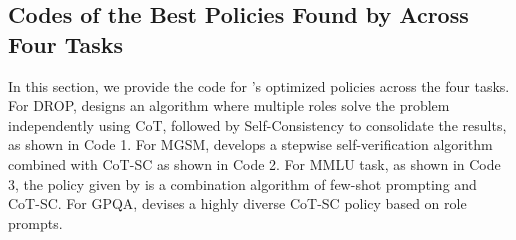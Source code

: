 \subsection{Codes of the Best Policies Found by \framework Across Four Tasks}
\label{sec:maincode}
In this section, we provide the code for \framework's optimized policies across the four tasks. 
For DROP, \framework designs an algorithm where multiple roles solve the problem independently using CoT, followed by Self-Consistency to consolidate the results, as shown in Code 1.
For MGSM, \framework develops a stepwise self-verification algorithm combined with CoT-SC as shown in Code 2.
For MMLU task, as shown in Code 3, the policy given by \framework is a combination algorithm of few-shot prompting and CoT-SC.
For GPQA, \framework devises a highly diverse CoT-SC policy based on role prompts.



